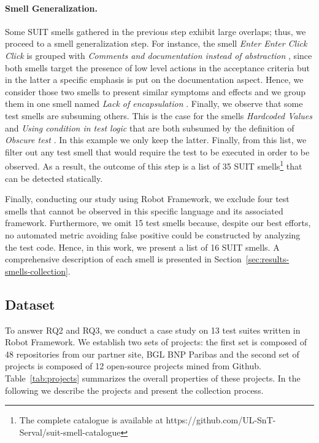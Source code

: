 \paragraph{\textbf{Smell Generalization.}}
Some SUIT smells gathered in the previous step exhibit large overlaps; thus, we proceed to a smell generalization step. For instance, the smell \emph{Enter Enter Click Click} \cite{Buwalda2015} is grouped with \emph{Comments and documentation instead of abstraction} \cite{Klarck2014}, since both smells target the presence of low level actions in the acceptance criteria but in the latter a specific emphasis is put on the documentation aspect. Hence, we consider those two smells to present similar symptoms and effects and we group them in one smell named \emph{Lack of encapsulation} \cite{Chen2012, Klarck2014, Buwalda2015, England2016, Renaudin2016}. Finally, we observe that some test smells are subsuming others. This is the case for the smells \emph{Hardcoded Values} and \emph{Using condition in test logic} that are both subsumed by the definition of \emph{Obscure test} \cite{Hauptmann2013, Gawinecki2016, Siminiuc2019}. In this example we only keep the latter.  Finally, from this list, we filter out any test smell that would require the test to be executed in order to be observed. As a result, the outcome of this step is a list of 35 SUIT smells\footnote{The complete catalogue is available at https://github.com/UL-SnT-Serval/suit-smell-catalogue} that can be detected statically.

Finally, conducting our study using Robot Framework, we exclude four test smells that cannot be observed in this specific language and its associated framework. Furthermore, we omit 15 test smells because, despite our best efforts, no automated metric avoiding false positive could be constructed by analyzing the test code. Hence, in this work, we present a list of 16 SUIT smells. A comprehensive description of each smell is presented in Section~\ref{sec:results-smells-collection}.

\subsection{Dataset}
\label{sec:data-collection}
To answer RQ2 and RQ3, we conduct a case study on 13 test suites written in Robot Framework. We establish two sets of projects: the first set is composed of 48 repositories from our partner site, BGL BNP Paribas and the second set of projects is composed of 12 open-source projects mined from Github. Table~\ref{tab:projects} summarizes the overall properties of these projects. In the following we describe the projects and present the collection process. 

